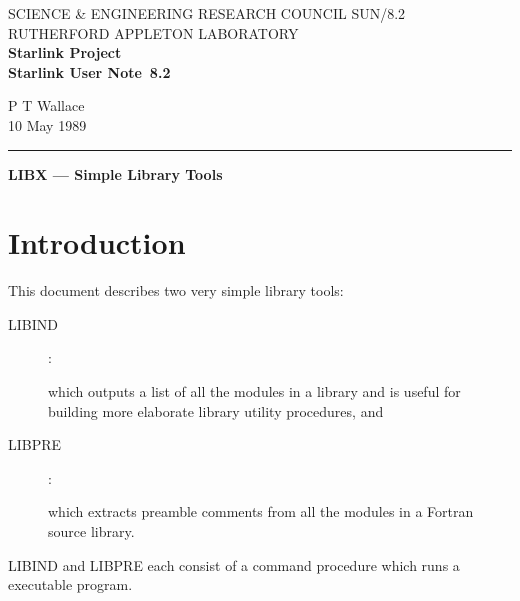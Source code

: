 \pagestyle{myheadings}

\newcommand{\stardoccategory}  {Starlink User Note}
\newcommand{\stardocinitials}  {SUN}
\newcommand{\stardocnumber}    {8.2}
\newcommand{\stardocauthors}   {P T Wallace}
\newcommand{\stardocdate}      {10 May 1989}
\newcommand{\stardoctitle}     {LIBX --- Simple Library Tools}

\newcommand{\stardocname}{\stardocinitials /\stardocnumber}
\markright{\stardocname}
\setlength{\textwidth}{160mm}
\setlength{\textheight}{240mm}
\setlength{\topmargin}{-5mm}
\setlength{\oddsidemargin}{0mm}
\setlength{\evensidemargin}{0mm}
\setlength{\parindent}{0mm}
\setlength{\parskip}{\medskipamount}
\setlength{\unitlength}{1mm}


\thispagestyle{empty}
SCIENCE \& ENGINEERING RESEARCH COUNCIL \hfill \stardocname\\
RUTHERFORD APPLETON LABORATORY\\
{\large\bf Starlink Project\\}
{\large\bf \stardoccategory\ \stardocnumber}
\begin{flushright}
\stardocauthors\\
\stardocdate
\end{flushright}
\vspace{-4mm}
\rule{\textwidth}{0.5mm}
\vspace{5mm}
\begin{center}
{\Large\bf \stardoctitle}
\end{center}
\vspace{5mm}

\section{Introduction}

This document describes two very simple library tools:
\begin{description}
\begin{description}
\item [LIBIND] :

which outputs a list of all the modules in a library and is useful
for building more elaborate library utility procedures, and

\item [LIBPRE] :

which extracts preamble comments from all the modules
in a Fortran source library.
\end{description}
\end{description}
LIBIND and LIBPRE each consist of a command procedure which
runs a executable program.

